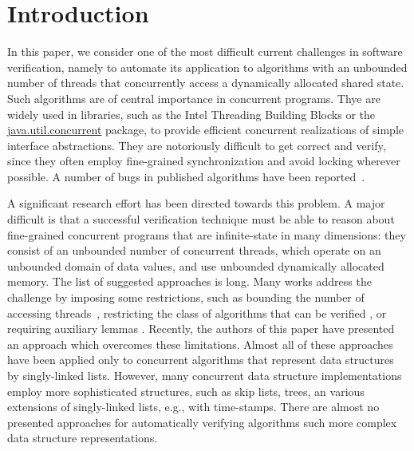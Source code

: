 \section{Introduction}

In this paper, we consider one of the most difficult current challenges in
software verification, namely to automate its
application to algorithms with an unbounded number of
threads that concurrently access a dynamically allocated shared state.
Such algorithms are of central importance in concurrent programs. 
Thye are widely used in libraries,
such as the Intel Threading Building Blocks or
the \url{java.util.concurrent} package,
to provide efficient concurrent realizations of
simple interface abstractions.
They are notoriously difficult to get correct and verify, since they
often employ fine-grained synchronization and avoid locking wherever
possible. A number of bugs  in published
algorithms have been reported~\cite{DDGJLMMSS:dcas,MiSc:correction}.


A significant research effort has been directed towards this problem.
A major difficult is that a successful verification technique must be
able to reason about fine-grained concurrent programs that are infinite-state
in many dimensions: 
they consist of an unbounded number of concurrent threads, which
operate on an unbounded domain of data values, and use
unbounded dynamically allocated memory. 
The list of suggested approaches  is long. Many works address the
challenge by imposing some restrictions, such as
bounding the number of accessing
threads~\cite{Amit:comparisonAbstraction,Vechev:spin09,CernyRZCA:CAV10},
restricting the class of algorithms that can be verified
\cite{HSV:concur13,Vafeiadis:cav10},
or requiring auxiliary lemmas
\cite{OHearnlist,Poling}.
Recently, the authors of this paper have presented an approach which
overcomes these limitations.
Almost all of these approaches have been applied only to concurrent algorithms
that represent data structures by singly-linked lists. However, many concurrent
data structure implementations employ more sophisticated structures, such as
skip lists, trees, an various extensions of singly-linked lists, e.g., with
time-stamps.
There are almost no presented approaches for automatically verifying algorithms
such more complex data structure representations.

